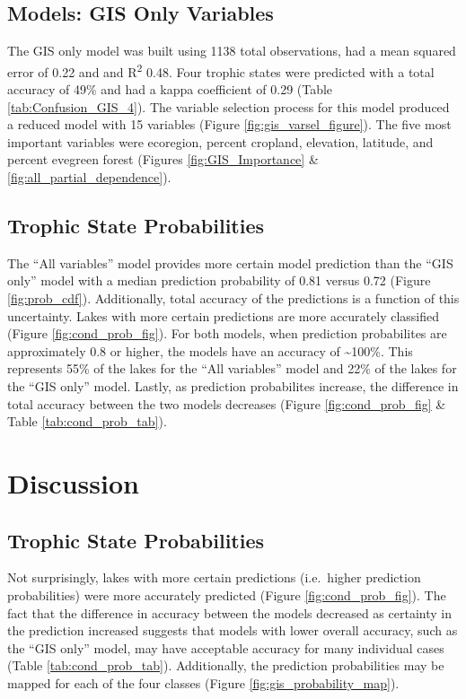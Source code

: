\documentclass[11pt,]{article}
\begin{document}
\subsection{Models: GIS Only Variables}\label{models-gis-only-variables}

The GIS only model was built using 1138 total observations, had a mean
squared error of 0.22 and and R\textsuperscript{2} 0.48. Four trophic
states were predicted with a total accuracy of 49\% and had a kappa
coefficient of 0.29 (Table \ref{tab:Confusion_GIS_4}). The variable
selection process for this model produced a reduced model with 15
variables (Figure \ref{fig:gis_varsel_figure}). The five most important
variables were ecoregion, percent cropland, elevation, latitude, and
percent evegreen forest (Figures \ref{fig:GIS_Importance} \&
\ref{fig:all_partial_dependence}).

\subsection{Trophic State
Probabilities}\label{trophic-state-probabilities-1}

The ``All variables'' model provides more certain model prediction than
the ``GIS only'' model with a median prediction probability of 0.81
versus 0.72 (Figure \ref{fig:prob_cdf}). Additionally, total accuracy of
the predictions is a function of this uncertainty. Lakes with more
certain predictions are more accurately classified (Figure
\ref{fig:cond_prob_fig}). For both models, when prediction probabilites
are approximately 0.8 or higher, the models have an accuracy of
\textasciitilde{}100\%. This represents 55\% of the lakes for the ``All
variables'' model and 22\% of the lakes for the ``GIS only'' model.
Lastly, as prediction probabilites increase, the difference in total
accuracy between the two models decreases (Figure
\ref{fig:cond_prob_fig} \& Table \ref{tab:cond_prob_tab}).

\section{Discussion}\label{discussion}

\subsection{Trophic State
Probabilities}\label{trophic-state-probabilities-2}

Not surprisingly, lakes with more certain predictions (i.e.~higher
prediction probabilities) were more accurately predicted (Figure
\ref{fig:cond_prob_fig}). The fact that the difference in accuracy
between the models decreased as certainty in the prediction increased
suggests that models with lower overall accuracy, such as the ``GIS
only'' model, may have acceptable accuracy for many individual cases
(Table \ref{tab:cond_prob_tab}). Additionally, the prediction
probabilities may be mapped for each of the four classes (Figure
\ref{fig:gis_probability_map}).
\end{document}

